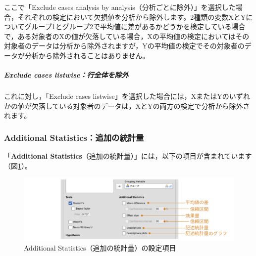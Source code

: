 \documentclass[
  12pt,
  a5jpaper,
  lualatex, ja=standard]{bxjsbook}
\begin{document}
ここで「Exclude cases analysis by analysis（分析ごとに除外）」を選択した場合，それぞれの検定において欠損値を分析から除外します。2種類の変数XとYについてグループ1とグループ2で平均値に差があるかどうかを検定している場合で，ある対象者のXの値が欠落している場合，Xの平均値の検定においてはその対象者のデータは分析から除外されますが，Yの平均値の検定でその対象者のデータが分析から除外されることはありません。

\hypertarget{exclude-cases-listwiseux884cux5168ux4f53ux3092ux9664ux5916}{%
\subparagraph*{Exclude cases listwise：行全体を除外}\label{exclude-cases-listwiseux884cux5168ux4f53ux3092ux9664ux5916}}

これに対し，「Exclude cases listwise」を選択した場合には，XまたはYのいずれかの値が欠落している対象者のデータは，XとYの両方の検定で分析から除外されます。

\hypertarget{subsub:ttest-additional-statistics}{%
\subsubsection*{Additional Statistics：追加の統計量}\label{subsub:ttest-additional-statistics}}

「\textbf{Additional Statistics}（追加の統計量）」には，以下の項目が含まれています（図\ref{fig:ttests-additional}）。

\begin{figure}[!ht]

{\centering \includegraphics[width=1\linewidth]{images/ttests/additional} 

}

\caption{Additional Statistics（追加の統計量）の設定項目}\label{fig:ttests-additional}
\end{figure}
\end{document}
